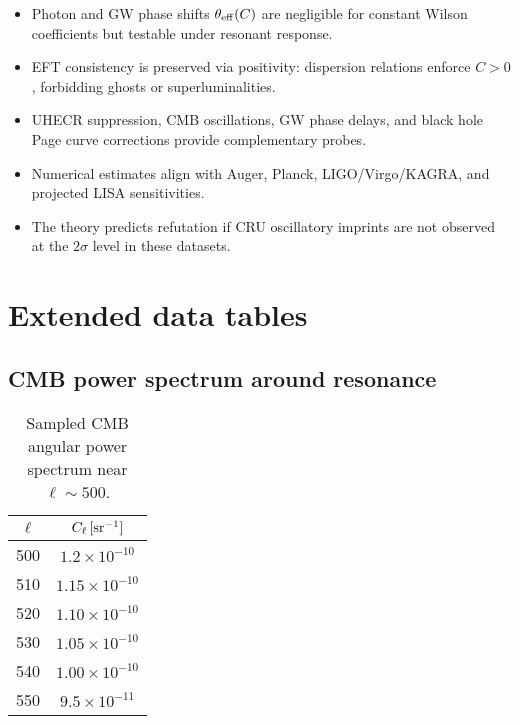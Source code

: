 \documentclass[%
 reprint,
 amsmath,amssymb,
 aps,
 pra,
 longbibliography,
 nofootinbib
]{revtex4-2}
\begin{document}
\begin{itemize}
\item Photon and GW phase shifts $\theta_{\rm eff}(C)$ are negligible for constant Wilson coefficients but testable under resonant response.
\item EFT consistency is preserved via positivity: dispersion relations enforce $C>0$, forbidding ghosts or superluminalities.
\item UHECR suppression, CMB oscillations, GW phase delays, and black hole Page curve corrections provide complementary probes.
\item Numerical estimates align with Auger, Planck, LIGO/Virgo/KAGRA, and projected LISA sensitivities.
\item The theory predicts refutation if CRU oscillatory imprints are not observed at the $2\sigma$ level in these datasets.
\end{itemize}

\appendix
\chapter{Extended data tables}
\section{CMB power spectrum around resonance}
\begin{table}[h]
\centering
\begin{tabular}{c c}
\toprule
$\ell$ & $C_\ell \, [{\rm sr}^{-1}]$ \\
\midrule
500 & $1.2\times10^{-10}$ \\
510 & $1.15\times10^{-10}$ \\
520 & $1.10\times10^{-10}$ \\
530 & $1.05\times10^{-10}$ \\
540 & $1.00\times10^{-10}$ \\
550 & $9.5\times10^{-11}$ \\
\bottomrule
\end{tabular}
\caption{Sampled CMB angular power spectrum near $\ell\sim500$.}
\end{table}
\end{document}
